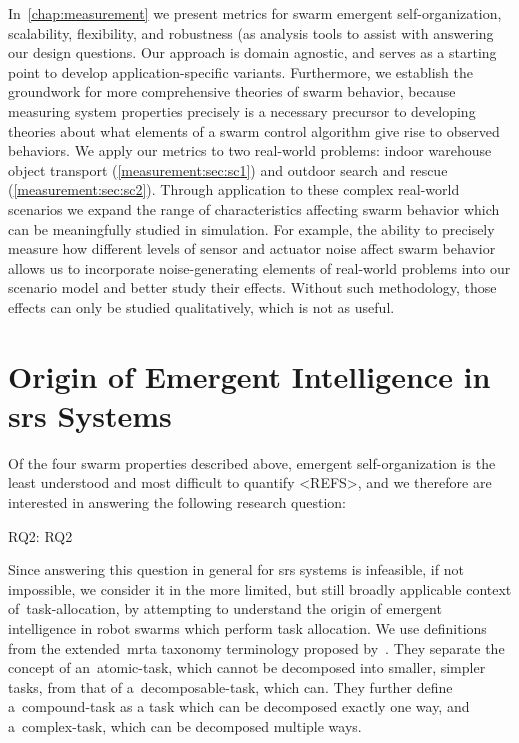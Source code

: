 \noindent
In~\cref{chap:measurement} we present metrics for swarm emergent
self-organization, scalability, flexibility, and robustness (as analysis tools
to assist with answering our design questions. Our approach is domain agnostic,
and serves as a starting point to develop application-specific
variants. Furthermore, we establish the groundwork for more comprehensive
theories of swarm behavior, because measuring system properties precisely is a
necessary precursor to developing theories about what elements of a swarm
control algorithm give rise to observed behaviors. We apply our metrics to two
real-world problems: indoor warehouse object transport
(\cref{measurement:sec:sc1}) and outdoor search and rescue
(\cref{measurement:sec:sc2}).  Through application to these complex real-world
scenarios we expand the range of characteristics affecting swarm behavior which
can be meaningfully studied in simulation. For example, the ability to precisely
measure how different levels of sensor and actuator noise affect swarm behavior
allows us to incorporate noise-generating elements of real-world problems into
our scenario model and better study their effects. Without such methodology,
those effects can only be studied qualitatively, which is not as useful.

\section{Origin of Emergent Intelligence in \gls{srs} Systems}
%
Of the four swarm properties described above, emergent self-organization is the
least understood and most difficult to quantify <REFS>, and we therefore are
interested in answering the following research question:

\medskip\noindent
\gls{RQ2}: \glsdesc{RQ2}
\medskip

\noindent
Since answering this question in general for \gls{srs} systems is infeasible, if
not impossible, we consider it in the more limited, but still broadly applicable
context of~\gls{task-allocation}, by attempting to understand the origin of
emergent intelligence in robot swarms which perform task allocation. We use
definitions from the extended~\gls{mrta} taxonomy terminology proposed
by~\cite{Korsah2013}.  They separate the concept of an~\gls{atomic-task}, which
cannot be decomposed into smaller, simpler tasks, from that of
a~\gls{decomposable-task}, which can. They further define a~\gls{compound-task}
as a task which can be decomposed exactly one way, and a~\gls{complex-task},
which can be decomposed multiple ways.


